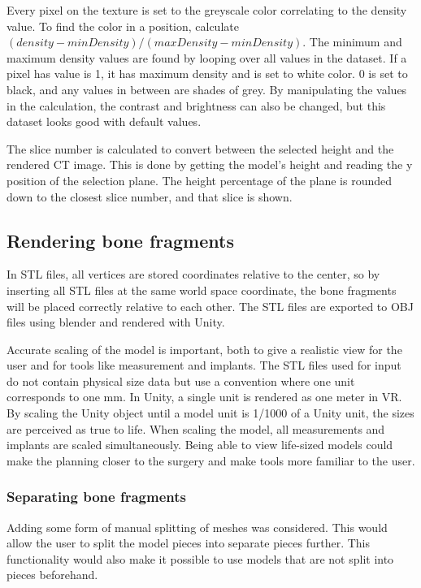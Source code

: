 \documentclass[a4paper]{report}
\begin{document}
Every pixel on the texture is set to the greyscale color correlating to the density value. To find the color in a position, calculate $(density-minDensity)/(maxDensity-minDensity)$. The minimum and maximum density values are found by looping over all values in the dataset.
If a pixel has value is 1, it has maximum density and is set to white color. 0 is set to black, and any values in between are shades of grey.
By manipulating the values in the calculation, the contrast and brightness can also be changed, but this dataset looks good with default values.


The slice number is calculated to convert between the selected height and the rendered CT image. This is done by getting the model's height and reading the y position of the selection plane. The height percentage of the plane is rounded down to the closest slice number, and that slice is shown.

\subsection{Rendering bone fragments}
In STL files, all vertices are stored coordinates relative to the center, so by inserting all STL files at the same world space coordinate, the bone fragments will be placed correctly relative to each other. The STL files are exported to OBJ files using blender and rendered with Unity.

Accurate scaling of the model is important, both to give a realistic view for the user and for tools like measurement and implants. The STL files used for input do not contain physical size data but use a convention where one unit corresponds to one mm. In Unity, a single unit is rendered as one meter in VR. By scaling the Unity object until a model unit is 1/1000 of a Unity unit, the sizes are perceived as true to life. When scaling the model, all measurements and implants are scaled simultaneously.
Being able to view life-sized models could make the planning closer to the surgery and make tools more familiar to the user.

\subsubsection{Separating bone fragments}
Adding some form of manual splitting of meshes was considered. This would allow the user to split the model pieces into separate pieces further. This functionality would also make it possible to use models that are not split into pieces beforehand.
\end{document}
